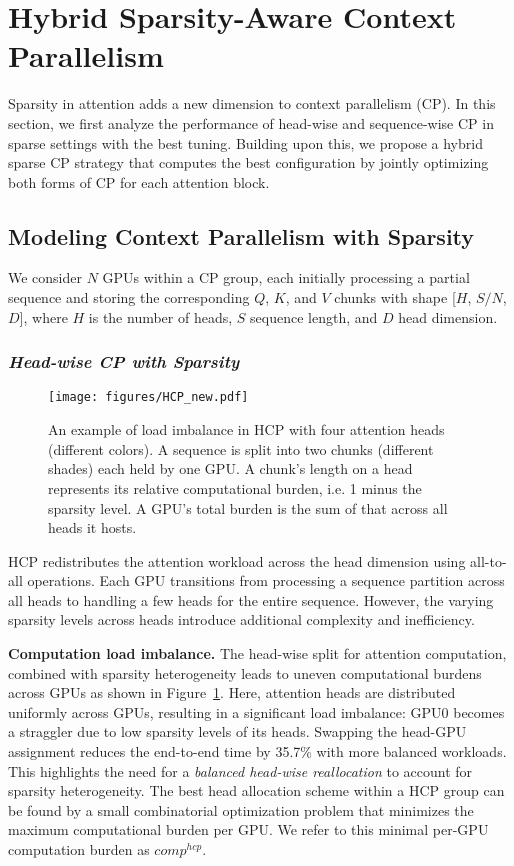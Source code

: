 \section{Hybrid Sparsity-Aware Context Parallelism}
\label{sec:parallelism}
Sparsity in attention adds a new dimension to context parallelism (CP). In this section, 
{we first analyze the performance of head-wise and sequence-wise CP in sparse settings with the best tuning. Building upon this, we propose a hybrid sparse CP strategy that computes the best configuration by jointly optimizing both forms of CP for each attention block.}

\subsection{Modeling Context Parallelism with Sparsity}
\label{subsec:parallel_modeling}
We consider $N$ GPUs within a CP group, each initially processing a partial sequence and storing the corresponding $Q$, $K$, and $V$ chunks with shape [$H$, $S/N$, $D$], where $H$ is the number of heads, $S$ sequence length, and $D$ head dimension.

\subsubsection{\bf \em Head-wise CP with Sparsity}

\begin{figure}[t]
  \centering
  \texttt{[image: figures/HCP\_new.pdf]} 
  \caption{An example of load imbalance in HCP with four attention heads (different colors). A sequence is split into two chunks (different shades) each held by one GPU. A chunk's length on a head represents its relative computational burden, i.e. 1 minus the sparsity level. A GPU's total burden is the sum of that across all heads it hosts.}
  \label{fig:hcp} 
\end{figure}



HCP redistributes the attention workload across the head dimension using all-to-all operations. Each GPU transitions from processing a sequence partition across all heads to handling a few heads for the entire sequence. However, the varying sparsity levels across heads introduce additional complexity and inefficiency.


\noindent\textbf{Computation load imbalance.} The head-wise split for attention computation, combined with sparsity heterogeneity leads to uneven computational burdens across GPUs as shown in Figure~\ref{fig:hcp}. Here, attention heads are distributed uniformly across GPUs, resulting in a significant load imbalance: GPU0 becomes a straggler due to low sparsity levels of its heads. Swapping the head-GPU assignment reduces the end-to-end time by 35.7\% with more balanced workloads. This highlights the need for a {\textit{balanced head-wise reallocation}} to account for sparsity heterogeneity. 
The best head allocation scheme within a HCP group can be found by a small combinatorial optimization problem that minimizes the maximum computational burden per GPU. We refer to this minimal per-GPU computation burden as $comp^{hcp}$. 


